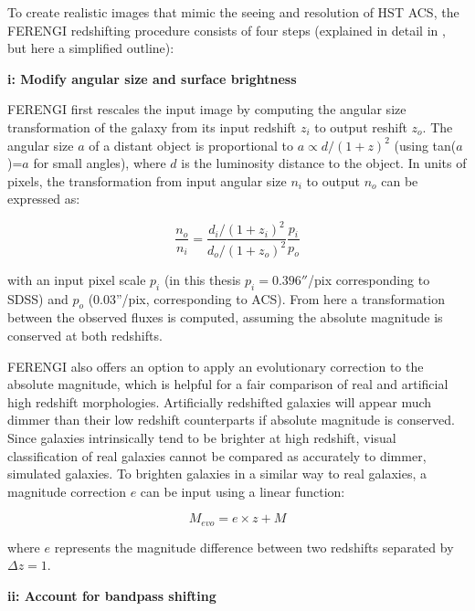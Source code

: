 To create realistic images that mimic the seeing and resolution of HST ACS, the FERENGI redshifting procedure consists of four steps (explained in detail in \citet{Barden2008}, but here a simplified outline):

\textbf{i: Modify angular size and surface brightness}

FERENGI first rescales the input image by computing the angular size transformation of the galaxy from its input redshift $z_{i}$ to output reshift $z_{o}$. The angular size $a$ of a distant object is proportional to $a \propto d/(1+z)^2$ (using tan($a$)=$a$ for small angles), where $d$ is the luminosity distance to the object. In units of pixels, the transformation from input angular size $n_{i}$ to output $n_{o}$ can be expressed as:

\begin{equation}
\frac{n_{o}}{n_{i}}= \frac{d_{i}/(1+z_{i})^2}{d_{o}/(1+z_{o})^2} \frac{p_{i}}{p_{o}} 
\label{eqn:ferengi_rebinning}
\end{equation}

with an input pixel scale $p_{i}$ (in this thesis $p_{i}=0.396''$/pix corresponding to SDSS) and $p_{o}$ (0.03''/pix, corresponding to ACS). From here a transformation between the observed fluxes is computed, assuming the absolute magnitude is conserved at both redshifts. 

FERENGI also offers an option to apply an evolutionary correction to the absolute magnitude, which is helpful for a fair comparison of real and artificial high redshift morphologies. Artificially redshifted galaxies will appear much dimmer than their low redshift counterparts if absolute magnitude is conserved.  Since galaxies intrinsically tend to be brighter at high redshift, visual classification of real galaxies cannot be compared as accurately to dimmer, simulated galaxies. To brighten galaxies in a similar way to real galaxies, a magnitude correction $e$ can be input using a linear function:

\begin{equation}
M_{evo} = e \times z + M
\label{eqn:ferengievolution}
\end{equation}

where $e$ represents the magnitude difference between two redshifts separated by $\Delta z=1$. 

\textbf{ii: Account for bandpass shifting} 

